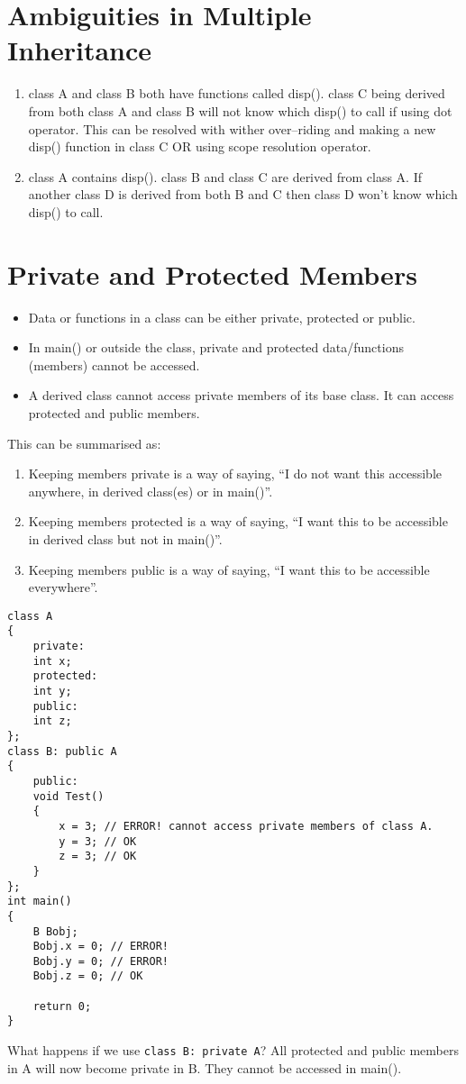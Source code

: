\documentclass[12pt,a4paper]{article}
\begin{document}
\section{Ambiguities in Multiple Inheritance}
\begin{enumerate}
\item class A and class B both have functions called disp(). class C being derived from both class A and class B will not know which disp() to call if using dot operator. This can be resolved with wither over--riding and making a new disp() function in class C OR using scope resolution operator.
\item class A contains disp(). class B and class C are derived from class A. If another class D is derived from both B and C then class D won't know which disp() to call.
\end{enumerate}
\section{Private and Protected Members}
\begin{itemize}
\item Data or functions in a class can be either private, protected or public.
\item In main() or outside the class, private and protected data/functions (members) cannot be accessed.
\item A derived class cannot access private members of its base class. It can access protected and public members.
\end{itemize}
This can be summarised as:
\begin{enumerate}
\item Keeping members private is a way of saying, ``I do not want this accessible anywhere, in derived class(es) or in main()''.
\item Keeping members protected is a way of saying, ``I want this to be accessible in derived class but not in main()''.
\item Keeping members public is a way of saying, ``I want this to be accessible everywhere''.
\end{enumerate}
\begin{lstlisting}[caption={private and protected members}]
class A
{
	private:
	int x;
	protected:
	int y;
	public:
	int z;
};
class B: public A
{
	public:
	void Test()
	{
		x = 3; // ERROR! cannot access private members of class A.
		y = 3; // OK
		z = 3; // OK
	}
};
int main()
{
	B Bobj;
	Bobj.x = 0; // ERROR!
	Bobj.y = 0; // ERROR!
	Bobj.z = 0; // OK
	
	return 0;
}
\end{lstlisting}
What happens if we use \verb|class B: private A|? All protected and public members in A will now become private in B. They cannot be accessed in main().


\end{document}
